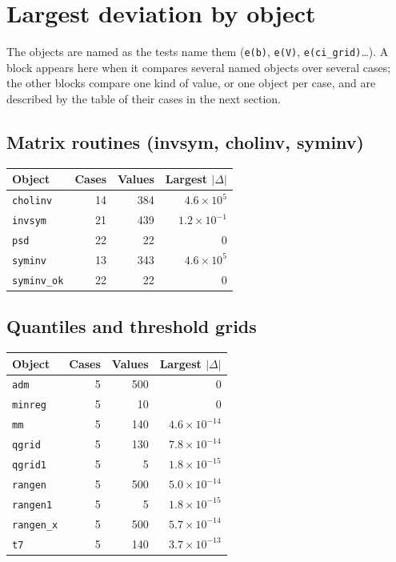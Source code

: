 \documentclass[10.5pt,a4paper]{article}
\newcommand{\code}[1]{\texttt{#1}}
\begin{document}
\section{Largest deviation by object}

The objects are named as the tests name them (\code{e(b)}, \code{e(V)}, \code{e(ci\_grid)}\ldots). A block appears here when it compares several named objects over several cases; the other blocks compare one kind of value, or one object per case, and are described by the table of their cases in the next section.

\subsection*{Matrix routines (invsym, cholinv, syminv)}

\begin{longtable}{@{}p{8.2cm}rrr@{}}
\toprule
Object & Cases & Values & Largest $|\Delta|$ \\
\midrule
\endhead
\texttt{cholinv} & 14 & 384 & $4.6\times10^{5}$ \\
\texttt{invsym} & 21 & 439 & $1.2\times10^{-1}$ \\
\texttt{psd} & 22 & 22 & 0 \\
\texttt{syminv} & 13 & 343 & $4.6\times10^{5}$ \\
\texttt{syminv\_\allowbreak{}ok} & 22 & 22 & 0 \\
\bottomrule
\end{longtable}

\subsection*{Quantiles and threshold grids}

\begin{longtable}{@{}p{8.2cm}rrr@{}}
\toprule
Object & Cases & Values & Largest $|\Delta|$ \\
\midrule
\endhead
\texttt{adm} & 5 & 500 & 0 \\
\texttt{minreg} & 5 & 10 & 0 \\
\texttt{mm} & 5 & 140 & $4.6\times10^{-14}$ \\
\texttt{qgrid} & 5 & 130 & $7.8\times10^{-14}$ \\
\texttt{qgrid1} & 5 & 5 & $1.8\times10^{-15}$ \\
\texttt{rangen} & 5 & 500 & $5.0\times10^{-14}$ \\
\texttt{rangen1} & 5 & 5 & $1.8\times10^{-15}$ \\
\texttt{rangen\_\allowbreak{}x} & 5 & 500 & $5.7\times10^{-14}$ \\
\texttt{t7} & 5 & 140 & $3.7\times10^{-13}$ \\
\bottomrule
\end{longtable}
\end{document}
